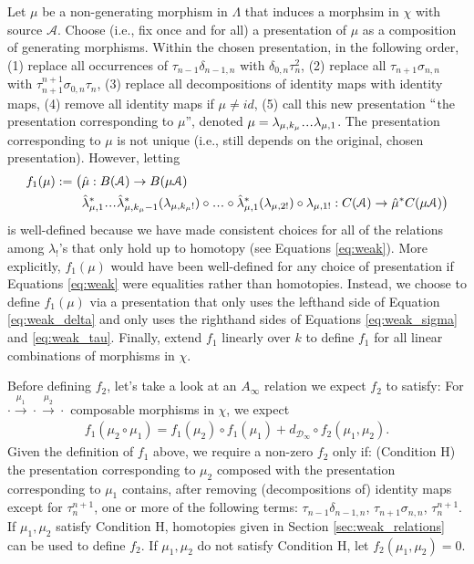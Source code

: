 Let $\mu$ be a non-generating morphism 
in $\Lambda$ that induces a morphsim in 
$\chi$ with source $\mathcal{A}$. Choose 
(i.e., fix once and 
for all) a presentation of $\mu$ as a 
composition of generating morphisms. 
Within the chosen presentation, in the 
following order, (1) replace 
all occurrences of $\tau_{n-1} \delta_{n-1,n}$ 
with $\delta_{0,n}\tau_n^2$, (2) replace all 
$\tau_{n+1}\sigma_{n,n}$ with 
$\tau_{n+1}^{n+1}\sigma_{0,n}\tau_n$, 
(3) replace all decompositions of identity 
maps with identity maps, (4) remove all 
identity maps if $\mu \neq id$, (5) call 
this new presentation 
$``$the presentation corresponding to $\mu$'', 
denoted $\mu = \lambda_{\mu,k_\mu}\smdots 
\lambda_{\mu,1}$. The presentation 
corresponding to $\mu$ is not unique (i.e., 
still depends on the original, chosen 
presentation). However, letting 
\begin{align*}
f_1(\mu) := \big(
&\hat{\mu}: 
B(\mathcal{A}) \to 
  B(\mu\mathcal{A})\\
&
\hat{\lambda}_{\mu,1}^*\smdots
  \hat{\lambda}_{\mu,k_\mu-1}^*
  (\lambda_{\mu,k_\mu!})
  \circ \smdots \circ
  \hat{\lambda}_{\mu,1}^*(\lambda_{\mu,2!})
  \circ \lambda_{\mu,1!}: C(\mathcal{A})
  \to \hat{\mu}^*C(\mu\mathcal{A}) \big)
\end{align*}
is well-defined because we have made 
consistent choices for all of the 
relations among $\lambda_!$'s that 
only hold up to homotopy (see Equations 
\ref{eq:weak}). More explicitly, 
$f_1(\mu)$ would have been well-defined 
for any choice of presentation if 
Equations \ref{eq:weak} were equalities 
rather than homotopies. Instead, 
we choose to define $f_1(\mu)$ via a 
presentation that only uses the lefthand 
side of Equation \ref{eq:weak_delta} and 
only uses the righthand sides of Equations 
\ref{eq:weak_sigma} and \ref{eq:weak_tau}.
Finally, extend $f_1$ linearly over $k$ to 
define $f_1$ for all linear combinations of 
morphisms in $\chi$.

Before defining $f_2$, let's take a look 
at an $A_\infty$ relation we expect 
$f_2$ to satisfy: For $\cdot 
\xrightarrow{\mu_1} \cdot 
\xrightarrow{\mu_2} \cdot$ 
composable morphisms in $\chi$, 
we expect
\begin{align}
\label{eq:A_2}
f_1(\mu_2\circ \mu_1) 
= 
f_1(\mu_2) \circ f_1(\mu_1) + 
d_{\mathcal{D}_\infty} \circ f_2(\mu_1, \mu_2).
\end{align}
Given the definition of $f_1$ above, 
we require a non-zero $f_2$ only if: 
(Condition H) 
the presentation corresponding to 
$\mu_2$ composed with the presentation 
corresponding to $\mu_1$ contains, after 
removing (decompositions of) identity 
maps except for $\tau_{n}^{n+1}$, one 
or more of the following terms:
$\tau_{n-1} \delta_{n-1,n}$, 
$\tau_{n+1}\sigma_{n,n}$, 
$\tau_{n}^{n+1}$. If $\mu_1, \mu_2$ 
satisfy Condition H, homotopies given 
in Section \ref{sec:weak_relations} 
can be used to define $f_2$. If 
$\mu_1, \mu_2$ do not satisfy Condition 
H, let $f_2(\mu_1, \mu_2) = 0$.


